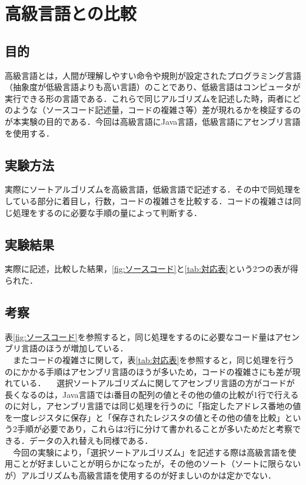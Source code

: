 \chapter{高級言語との比較}
\section{目的}
高級言語とは，人間が理解しやすい命令や規則が設定されたプログラミング言語（抽象度が低級言語よりも高い言語）のことであり、低級言語はコンピュータが実行できる形の言語である．これらで同じアルゴリズムを記述した時，両者にどのような（ソースコード記述量，コードの複雑さ等）差が現れるかを検証するのが本実験の目的である．今回は高級言語にJava言語，低級言語にアセンブリ言語を使用する．

\section{実験方法}
実際にソートアルゴリズムを高級言語，低級言語で記述する．その中で同処理をしている部分に着目し，行数，コードの複雑さを比較する．コードの複雑さは同じ処理をするのに必要な手順の量によって判断する．

\section{実験結果}
実際に記述，比較した結果，\ref{fig:ソースコード}と\ref{tab:対応表}という2つの表が得られた．

\section{考察}
 表\ref{fig:ソースコード}を参照すると，同じ処理をするのに必要なコード量はアセンブリ言語のほうが増加している．\\
 \ \ またコードの複雑さに関して，表\ref{tab:対応表}を参照すると，同じ処理を行うのにかかる手順はアセンブリ言語のほうが多いため，コードの複雑さにも差が現れている．
 \ \ 選択ソートアルゴリズムに関してアセンブリ言語の方がコードが長くなるのは，Java言語ではi番目の配列の値とその他の値の比較が1行で行えるのに対し，アセンブリ言語では同じ処理を行うのに「指定したアドレス番地の値を一度レジスタに保存」と「保存されたレジスタの値とその他の値を比較」という2手順が必要であり，これらは2行に分けて書かれることが多いためだと考察できる．データの入れ替えも同様である．\\
 \ \ 今回の実験により，「選択ソートアルゴリズム」を記述する際は高級言語を使用ことが好ましいことが明らかになったが，その他のソート（ソートに限らないが）アルゴリズムも高級言語を使用するのが好ましいのかは定かでない．





